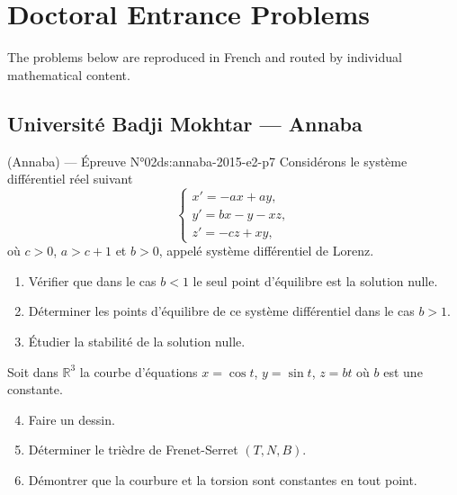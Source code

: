 \chapter{Doctoral Entrance Problems}
\label{ch:problems}

The problems below are reproduced in French and routed by individual mathematical content.
\newpage

\section{Université Badji Mokhtar --- Annaba}
\begin{problem}{(Annaba) — Épreuve N°02}{ds:annaba-2015-e2-p7}
Considérons le système différentiel réel suivant
$$\begin{cases}x'=-ax+ay,\\ y'=bx-y-xz,\\ z'=-cz+xy,\end{cases}$$
où $c>0$, $a>c+1$ et $b>0$, appelé système différentiel de Lorenz.
\begin{enumerate}\item Vérifier que dans le cas $b<1$ le seul point d'équilibre est la solution nulle.\item Déterminer les points d'équilibre de ce système différentiel dans le cas $b>1$.\item Étudier la stabilité de la solution nulle.\end{enumerate}
Soit dans $\mathbb{R}^3$ la courbe d'équations $x=\cos t$, $y=\sin t$, $z=bt$ où $b$ est une constante.
\begin{enumerate}\setcounter{enumi}{3}\item Faire un dessin.\item Déterminer le trièdre de Frenet-Serret $(T,N,B)$.\item Démontrer que la courbure et la torsion sont constantes en tout point.\end{enumerate}
\end{problem}
\newpage

